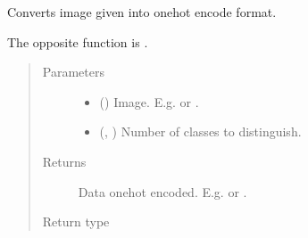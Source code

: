 \documentclass[letterpaper,10pt,english]{sphinxmanual}
\begin{document}
\begin{fulllineitems}
\label{\detokenize{utils/util:utils.util.img_to_onehot_encoding}}
Converts image given into one\sphinxhyphen{}hot encode format.

The opposite function is {\hyperref[\detokenize{utils/util:utils.util.onehot_encoding_to_img}]{}}.
\begin{quote}\begin{description}
\item[{Parameters}] \leavevmode\begin{itemize}
\item {} 
 () \textendash{} Image. E.g.  or .

\item {} 
 (, ) \textendash{} Number of classes to distinguish.

\end{itemize}

\item[{Returns}] \leavevmode
{} \textendash{} Data one\sphinxhyphen{}hot encoded. E.g.  or .

\item[{Return type}] \leavevmode
{}

\end{description}\end{quote}

\end{fulllineitems}

\end{document}
